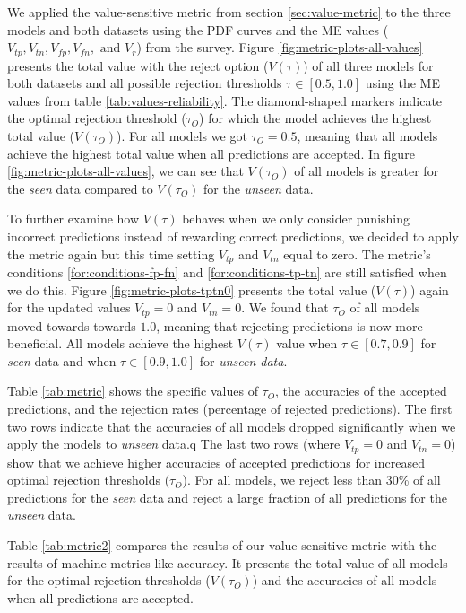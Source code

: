 %
We applied the value-sensitive metric from section \ref{sec:value-metric} to the three models and both datasets using the PDF curves and the ME values ($V_{tp}, V_{tn}, V_{fp}, V_{fn}, \text{ and } V_r$) from the survey.
%
Figure \ref{fig:metric-plots-all-values} presents the total value with the reject option ($V(\tau)$) of all three models for both datasets and all possible rejection thresholds $\tau \in [0.5, 1.0]$ using the ME values from table \ref{tab:values-reliability}.
%
The diamond-shaped markers indicate the optimal rejection threshold ($\tau_O$) for which the model achieves the highest total value ($V(\tau_O)$).
%
For all models we got $\tau_O = 0.5$, meaning that all models achieve the highest total value when all predictions are accepted.
%
In figure \ref{fig:metric-plots-all-values}, we can see that $V(\tau_O)$ of all models is greater for the \emph{seen} data compared to $V(\tau_O)$ for the \emph{unseen} data.
%

%
To further examine how $V(\tau)$ behaves when we only consider punishing incorrect predictions instead of rewarding correct predictions, we decided to apply the metric again but this time setting $V_{tp}$ and $V_{tn}$ equal to zero.
%
The metric's conditions \ref{for:conditions-fp-fn} and \ref{for:conditions-tp-tn} are still satisfied when we do this.
%
Figure \ref{fig:metric-plots-tptn0} presents the total value ($V(\tau)$) again for the updated values $V_{tp}=0$ and $V_{tn}=0$.
%
We found that $\tau_O$ of all models moved towards towards $1.0$, meaning that rejecting predictions is now more beneficial.
%
All models achieve the highest $V(\tau)$ value when $\tau \in [0.7, 0.9]$ for \emph{seen} data and when $\tau \in [0.9, 1.0]$ for \emph{unseen data}.
%

%
Table \ref{tab:metric} shows the specific values of $\tau_O$, the accuracies of the accepted predictions, and the rejection rates (percentage of rejected predictions).
%
The first two rows indicate that the accuracies of all models dropped significantly when we apply the models to \emph{unseen} data.q
%
The last two rows (where $V_{tp}=0$ and $V_{tn}=0$) show that we achieve higher accuracies of accepted predictions for increased optimal rejection thresholds ($\tau_O$).
%
For all models, we reject less than 30\% of all predictions for the \emph{seen} data and reject a large fraction of all predictions for the \emph{unseen} data.
%

%
Table \ref{tab:metric2} compares the results of our value-sensitive metric with the results of machine metrics like accuracy.
%
It presents the total value of all models for the optimal rejection thresholds ($V(\tau_O)$) and the accuracies of all models when all predictions are accepted.
%



